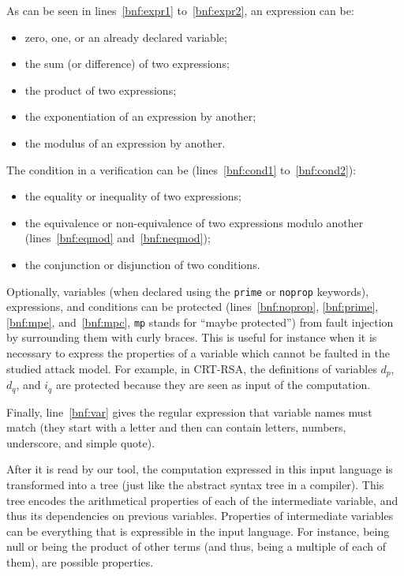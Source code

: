 \documentclass[10pt]{article}
\theoremstyle{definition}
\theoremstyle{theorem}
\begin{document}
\noindent
As can be seen in lines~\ref{bnf:expr1} to~\ref{bnf:expr2}, an expression can be:
\begin{itemize}
\item zero, one, or an already declared variable;
\item the sum (or difference) of two expressions;
\item the product of two expressions;
\item the exponentiation of an expression by another;
\item the modulus of an expression by another.
\end{itemize}

\noindent
The condition in a verification can be (lines~\ref{bnf:cond1} to~\ref{bnf:cond2}):
\begin{itemize}
\item the equality or inequality of two expressions;
\item the equivalence or non-equivalence of two expressions modulo another (lines~\ref{bnf:eqmod} and~\ref{bnf:neqmod});
\item the conjunction or disjunction of two conditions.
\end{itemize}

Optionally, variables (when declared using the {\tt prime} or {\tt noprop} keywords), expressions, and conditions can be protected (lines~\ref{bnf:noprop}, \ref{bnf:prime}, \ref{bnf:mpe}, and~\ref{bnf:mpc}, {\tt mp} stands for ``maybe protected'') from fault injection by surrounding them with curly braces.
This is useful for instance when it is necessary to express the properties of a variable which cannot be faulted in the studied attack model.
For example, in CRT-RSA, the definitions of variables $d_p$, $d_q$, and $i_q$ are protected because they are seen as input of the computation.

Finally, line~\ref{bnf:var} gives the regular expression that variable names must match (they start with a letter and then can contain letters, numbers, underscore, and simple quote).

\medskip

After it is read by our tool, the computation expressed in this input language is transformed into a tree (just like the abstract syntax tree in a compiler).
This tree encodes the arithmetical properties of each of the intermediate variable, and thus its dependencies on previous variables.
Properties of intermediate variables can be everything that is expressible in the input language.
For instance, being null or being the product of other terms (and thus, being a multiple of each of them), are possible properties.
\end{document}
